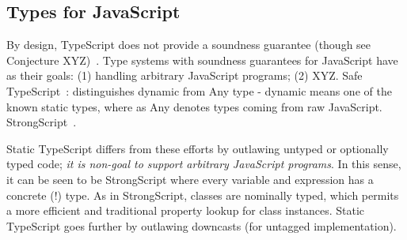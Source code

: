 












\subsection{Types for JavaScript}

By design, TypeScript does not provide a soundness guarantee (though see Conjecture XYZ)~\cite{BiermanAT14}.
Type systems with soundness guarantees for JavaScript have as their
goals: (1) handling arbitrary JavaScript programs; (2) XYZ.
Safe TypeScript~\cite{SafeTypeScript15}: distinguishes dynamic from Any type - dynamic means
one of the known static types, where as Any denotes types coming
from raw JavaScript.
StrongScript~\cite{StrongScriptECOOP15}.

Static TypeScript differs from these efforts by outlawing untyped or optionally typed
code; \emph{it is non-goal to support arbitrary JavaScript programs}.
In this sense, it can be seen to be StrongScript where every variable and 
expression has a concrete (!) type.   As in StrongScript, classes are nominally typed,
which permits a more efficient and traditional property lookup for class instances. 
Static TypeScript goes further by outlawing downcasts (for untagged implementation).

